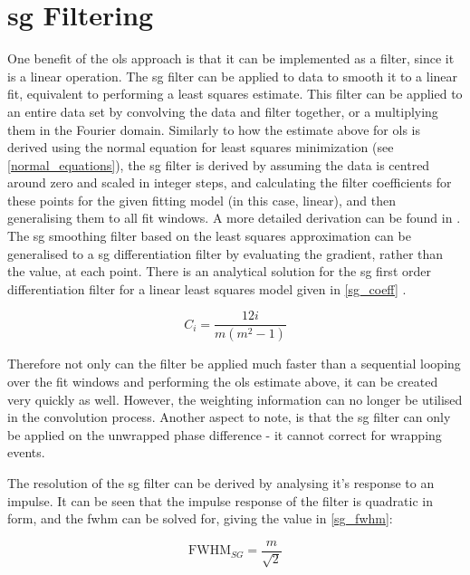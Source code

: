 \section{\ac{sg} Filtering}\label{sg_filter}
One benefit of the \ac{ols} approach is that it can be implemented as a filter, since it is a linear operation. The \ac{sg} filter \cite{savitzky_smoothing_1964} can be applied to data to smooth it to a linear fit, equivalent to performing a least squares estimate. This filter can be applied to an entire data set by convolving the data and filter together, or a multiplying them in the Fourier domain. Similarly to how the estimate above for \ac{ols} is derived using the normal equation for least squares minimization (see \autoref{normal_equations}), the \ac{sg} filter is derived by assuming the data is centred around zero and scaled in integer steps, and calculating the filter coefficients for these points for the given fitting model (in this case, linear), and then generalising them to all fit windows. A more detailed derivation can be found in \cite{savitzky_smoothing_1964}. The \ac{sg} smoothing filter based on the least squares approximation can be generalised to a \ac{sg} differentiation filter by evaluating the gradient, rather than the value, at each point. There is an analytical solution for the \ac{sg} first order differentiation filter for a linear least squares model given in \autoref{sg_coeff} \cite{madden_comments_1978}.

\begin{equation}
	\label{sg_coeff}
	C_i = \frac{12 i}{m(m^2-1)}
\end{equation}

Therefore not only can the filter be applied much faster than a sequential looping over the fit windows and performing the \ac{ols} estimate above, it can be created very quickly as well. However, the weighting information can no longer be utilised in the convolution process. Another aspect to note, is that the \ac{sg} filter can only be applied on the unwrapped phase difference - it cannot correct for wrapping events. 

The resolution of the \ac{sg} filter can be derived by analysing it's response to an impulse. It can be seen that the impulse response of the filter is quadratic in form, and the \ac{fwhm} can be solved for, giving the value in \autoref{sg_fwhm}:

\begin{equation}
	\label{sg_fwhm}
	\text{FWHM}_{SG} = \frac{m}{\sqrt{2}}
\end{equation}


